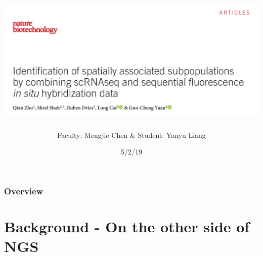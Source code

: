 \documentclass{beamer}
\title{\includegraphics[width=\textwidth]{title}} %
\author{Faculty: Mengjie Chen \& Student: Yanyu Liang}
\institute[]
{
GGSB Journal Club
}
\date{5/2/19} %
\begin{document}
\begin{frame}
\titlepage %
\end{frame}
\begin{frame}
\frametitle{Overview} %
\tableofcontents %
\end{frame}



\section{Background - On the other side of NGS}
\end{document}
